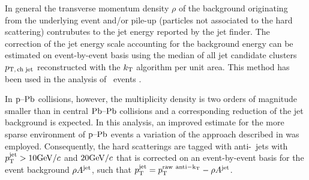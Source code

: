 In general the transverse momentum density $\rho$ of the background originating from the underlying event and/or pile-up (particles not associated to the hard scattering) contrubutes to the jet energy reported by the jet finder. The correction of the jet energy scale accounting for the background energy can be estimated on event-by-event basis using the median of all jet candidate clusters $p_\mathrm{T,\,ch\;jet}$ reconstructed with the $k_{\textnormal{T}}$ algorithm per unit area. This method has been used in the analysis of \PbPb\ events \cite{Abelev:2013kqa,Adam:2015ewa}.

In $\mbox{p--Pb}$ collisions, however, the multiplicity density is two orders of magnitude smaller than in central $\mbox{Pb--Pb}$ collisions \cite{ALICE:2012xs} and a corresponding reduction of the jet background is expected. In this analysis, an improved estimate for the more sparse environment of $\mbox{p--Pb}$ events a variation \cite{Adam:2015hoa} of the approach described in \cite{Chatrchyan:2012tt} was employed. Consequently, the hard scatterings are tagged with anti-\kt\ jets with $p_{\mathrm{T}}^{\mathrm{jet}} > 10 \mathrm{GeV}/c$ and $20 \mathrm{GeV}/c$ that is corrected on an event-by-event basis for the event background $\rho A^{\mathrm{jet}}$, such that $p_{\mathrm{T}}^{\mathrm{jet}} = p_{\mathrm{T}}^{{\rm raw~anti-k_{\textnormal{T}}}} - \rho A^{\mathrm{jet}}$.

